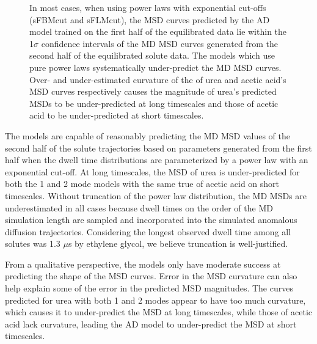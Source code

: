 \documentclass{article}
\begin{document}
\begin{figure}
  \caption{In most cases, when using power laws with exponential cut-offs 
  (sFBMcut and sFLMcut), the MSD curves predicted by the AD model trained on 
  the first half of the equilibrated data lie within the 1$\sigma$ confidence
  intervals of the MD MSD curves generated from the second half of the equilibrated
  solute data. The models which use pure power laws systematically under-predict
  the MD MSD curves. Over- and under-estimated curvature of the of urea and acetic acid's 
  MSD curves respectively causes the magnitude of urea's predicted MSDs to be 
  under-predicted at long timescales and those of acetic acid to be under-predicted
  at short timescales.}\label{fig:train_test}
  \end{figure}
  
  The models are capable of reasonably predicting the MD MSD values of the second
  half of the solute trajectories based on parameters generated from the first half
  when the dwell time distributions are parameterized by a power law with an 
  exponential cut-off. At long timescales, the MSD of urea is under-predicted 
  for both the 1 and 2 mode models with the same true of acetic acid on short 
  timescales. Without truncation of the power law distribution, the MD 
  MSDs are underestimated in all cases because dwell times on the order of the
  MD simulation length are sampled and incorporated into the simulated anomalous
  diffusion trajectories. Considering the longest observed dwell time among all
  solutes was 1.3 $\mu$s by ethylene glycol, we believe truncation is well-justified.
  
  
  From a qualitative perspective, the models only have moderate success at predicting
  the shape of the MSD curves. Error in the MSD curvature can also help explain some of
  the error in the predicted MSD magnitudes. The curves predicted for urea with both 1 
  and 2 modes appear to have too much curvature, which causes it to under-predict the 
  MSD at long timescales, while those of acetic acid lack curvature, leading the
  AD model to under-predict the MSD at short timescales. 
  
\end{document}
